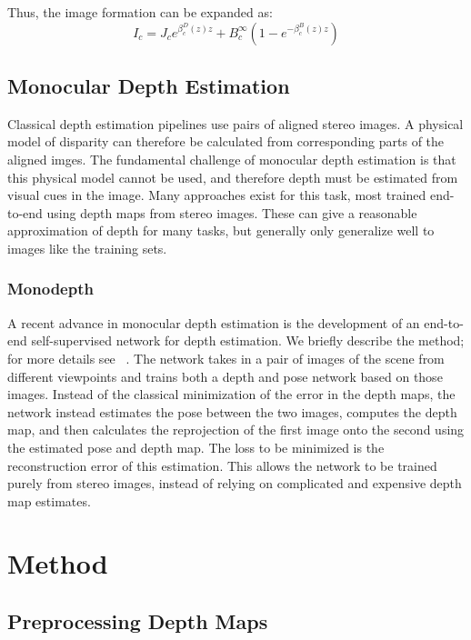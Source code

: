\documentclass[10pt,twocolumn,letterpaper]{article}
\begin{document}
Thus, the image formation can be expanded as:
\begin{equation}
\label{eqn:imageformationexpanded}
I_c = J_c e^{\beta_c^D(z)z} + B^\infty_c \left( 1 - e^{-\beta_c^B(z)z} \right)
\end{equation}

\subsection{Monocular Depth Estimation}

Classical depth estimation pipelines use pairs of aligned stereo images. A physical model of disparity can therefore
be calculated from corresponding parts of the aligned imges. The fundamental challenge of monocular depth estimation is
that this physical model cannot be used, and therefore depth must be estimated from visual cues in the image. Many
approaches exist for this task, most trained end-to-end using depth maps from stereo images. These can give a reasonable
approximation of depth for many tasks, but generally only generalize well to images like the training sets.

\subsubsection*{Monodepth}

A recent advance in monocular depth estimation is the development of an end-to-end self-supervised network for depth
estimation. We briefly describe the method; for more details see ~\cite{monodepth2}. The network takes in a pair
of images of the scene from different viewpoints and trains both a depth and pose network based on those images.
Instead of the classical minimization of the error in the depth maps, the network instead estimates the pose
between the two images, computes the depth map, and then calculates the reprojection of the first image onto the
second using the estimated pose and depth map. The loss to be minimized is the reconstruction error of this estimation.
This allows the network to be trained purely from stereo images, instead of relying on complicated and expensive
depth map estimates.

\section{Method}

\subsection{Preprocessing Depth Maps}
\end{document}
